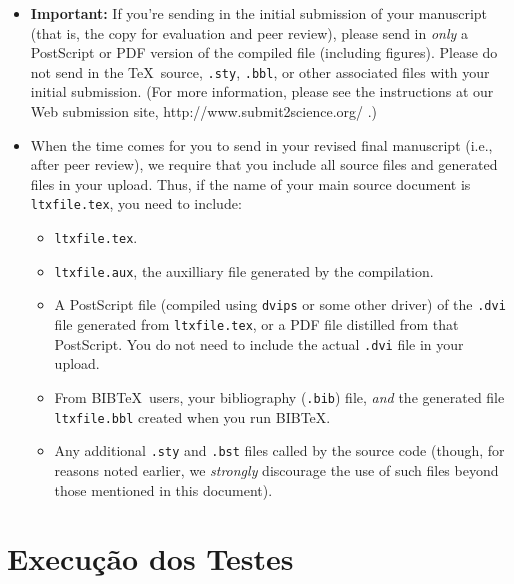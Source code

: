 \documentclass[12pt]{article}
\begin{document}
\begin{itemize}
\item {\bf Important:} If you're sending in the initial submission of
  your manuscript (that is, the copy for evaluation and peer review),
  please send in {\it only\/} a PostScript or PDF version of the
  compiled file (including figures).  Please do not send in the \TeX\ 
  source, \texttt{.sty}, \texttt{.bbl}, or other associated files with
  your initial submission.  (For more information, please see the
  instructions at our Web submission site,
  http://www.submit2science.org/ .)
\item When the time comes for you to send in your revised final
  manuscript (i.e., after peer review), we require that you include
  all source files and generated files in your upload.  Thus, if the
  name of your main source document is \texttt{ltxfile.tex}, you
  need to include:
\begin{itemize}
\item \texttt{ltxfile.tex}.
\item \texttt{ltxfile.aux}, the auxilliary file generated by the
  compilation.
\item A PostScript file (compiled using \texttt{dvips} or some other
  driver) of the \texttt{.dvi} file generated from
  \texttt{ltxfile.tex}, or a PDF file distilled from that
  PostScript.  You do not need to include the actual \texttt{.dvi}
  file in your upload.
\item From B{\small{IB}}\TeX\ users, your bibliography (\texttt{.bib})
  file, {\it and\/} the generated file \texttt{ltxfile.bbl} created
  when you run B{\small{IB}}\TeX.
\item Any additional \texttt{.sty} and \texttt{.bst} files called by
  the source code (though, for reasons noted earlier, we {\it
    strongly\/} discourage the use of such files beyond those
  mentioned in this document).
\end{itemize}
\end{itemize}


\section*{Execução dos Testes}
\end{document}
